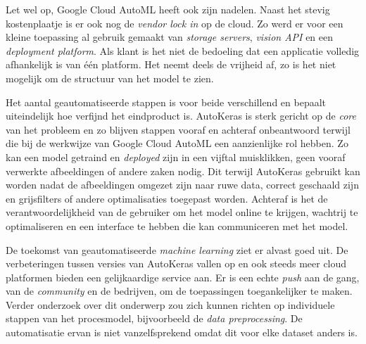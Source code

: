 Let wel op, Google Cloud AutoML heeft ook zijn nadelen. Naast het stevig kostenplaatje is er ook nog de \textit{vendor lock in} op de cloud. Zo werd er voor een kleine toepassing al gebruik gemaakt van \textit{storage servers}, \textit{vision API} en een \textit{deployment platform}. Als klant is het niet de bedoeling dat een applicatie volledig afhankelijk is van één platform. Het neemt deels de vrijheid af, zo is het niet mogelijk om de structuur van het model te zien. 

Het aantal geautomatiseerde stappen is voor beide verschillend en bepaalt uiteindelijk hoe verfijnd het eindproduct is. AutoKeras is sterk gericht op de \textit{core} van het probleem en zo blijven stappen vooraf en achteraf onbeantwoord terwijl die bij de werkwijze van Google Cloud AutoML een aanzienlijke rol hebben. Zo kan een model getraind en \textit{deployed} zijn in een vijftal muisklikken, geen vooraf verwerkte afbeeldingen of andere zaken nodig. Dit terwijl AutoKeras gebruikt kan worden nadat de afbeeldingen omgezet zijn naar ruwe data, correct geschaald zijn en grijsfilters of andere optimalisaties toegepast worden. Achteraf is het de verantwoordelijkheid van de gebruiker om het model online te krijgen, wachtrij te optimaliseren en een interface te hebben die kan communiceren met het model.

De toekomst van geautomatiseerde \textit{machine learning} ziet er alvast goed uit. De verbeteringen tussen versies van AutoKeras vallen op en ook steeds meer cloud platformen bieden een gelijkaardige service aan. Er is een echte \textit{push} aan de gang, van de \textit{community} en de bedrijven, om de toepassingen toegankelijker te maken. Verder onderzoek over dit onderwerp zou zich kunnen richten op individuele stappen van het procesmodel, bijvoorbeeld de \textit{data preprocessing}. De automatisatie ervan is niet vanzelfsprekend omdat dit voor elke dataset anders is.